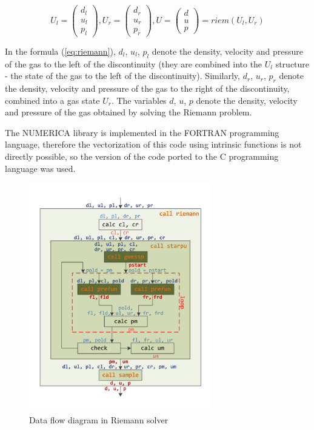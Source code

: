 \documentclass[utf8,english]{psta}%
\begin{document}
\begin{equation}\label{eq:riemann}
U_l = \left( \begin{array}{ccc} d_l \\ u_l \\ p_l \end{array} \right),
U_r = \left( \begin{array}{ccc} d_r \\ u_r \\ p_r \end{array} \right),
U = \left( \begin{array}{ccc} d \\ u \\ p \end{array} \right) = riem(U_l, U_r)
\end{equation}

In the formula (\ref{eq:riemann}), $d_l$, $u_l$, $p_l$ denote the density, velocity and pressure of the gas to the left of the discontinuity (they are combined into the $U_l$ structure - the state of the gas to the left of the discontinuity).
Similarly, $d_r$, $u_r$, $p_r$ denote the density, velocity and pressure of the gas to the right of the discontinuity, combined into a gas state $U_r$.
The variables $d$, $u$, $p$ denote the density, velocity and pressure of the gas obtained by solving the Riemann problem.

The NUMERICA library is implemented in the FORTRAN programming language, therefore the vectorization of this code using intrinsic functions is not directly possible, so the version of the code ported to the C programming language was used.

\begin{figure}
\includegraphics[width=8cm]{pics/pic_functions}
\caption{Data flow diagram in Riemann solver}
\label{pic:functions}
\end{figure}
\end{document}
